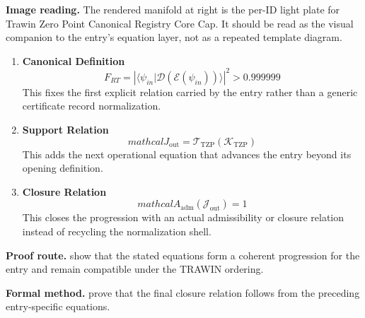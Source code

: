 \begin{samepage}
\noindent\begin{minipage}[t]{0.45\linewidth}
\vspace{0pt}
\raggedright
\scriptsize\textbf{Image reading.} The rendered manifold at right is the per-ID light plate for Trawin Zero Point Canonical Registry Core Cap. It should be read as the visual companion to the entry's equation layer, not as a repeated template diagram.\par
\end{minipage}\hfill
\begin{minipage}[t]{0.53\linewidth}
\vspace*{-0.10in}
\raggedright
{}
\end{minipage}
\end{samepage}

\clearpage


\begin{enumerate}[leftmargin=1.6em,itemsep=9pt,topsep=6pt]
\item \textbf{Canonical Definition}
\[
F_{RT} = |\langle \psi_{in} \lvert \mathcal{D}(\mathcal{E}(\psi_{in})) \rangle|^2 > 0.999999
\]
This fixes the first explicit relation carried by the entry rather than a generic certificate record normalization.

\item \textbf{Support Relation}
\[
mathcal{J}_{\mathrm{out}} = \mathcal{T}_{\mathrm{TZP}}\!\left(\mathcal{K}_{\mathrm{TZP}}\right)
\]
This adds the next operational equation that advances the entry beyond its opening definition.

\item \textbf{Closure Relation}
\[
mathcal{A}_{\mathrm{adm}}\!\left(\mathcal{J}_{\mathrm{out}}\right)=1
\]
This closes the progression with an actual admissibility or closure relation instead of recycling the normalization shell.
\end{enumerate}

\textbf{Proof route.} show that the stated equations form a coherent progression for the entry and remain compatible under the TRAWIN ordering.

\textbf{Formal method.} prove that the final closure relation follows from the preceding entry-specific equations.

